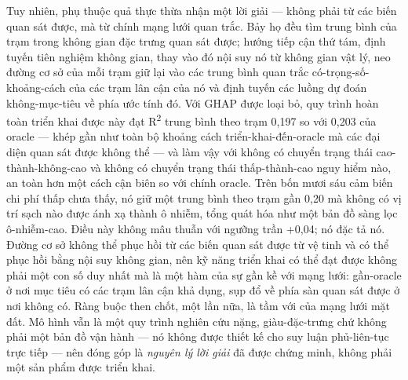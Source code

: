 Tuy nhiên, phụ thuộc quả thực thừa nhận một lời giải --- không phải từ các biến quan sát được, mà từ chính mạng lưới quan trắc. Bảy họ đều tìm trung bình của trạm trong không gian đặc trưng quan sát được; hướng tiếp cận thứ tám, định tuyến tiên nghiệm không gian, thay vào đó nội suy nó từ không gian vật lý, neo đường cơ sở của mỗi trạm giữ lại vào các trung bình quan trắc có-trọng-số-khoảng-cách của các trạm lân cận của nó và định tuyến các luồng dự đoán không-mục-tiêu về phía ước tính đó. Với GHAP được loại bỏ, quy trình hoàn toàn triển khai được này đạt R\textsuperscript{2} trung bình theo trạm 0,197 so với 0,203 của oracle --- khép gần như toàn bộ khoảng cách triển-khai-đến-oracle mà các đại diện quan sát được không thể --- và làm vậy với không có chuyển trạng thái cao-thành-không-cao và không có chuyển trạng thái thấp-thành-cao nguy hiểm nào, an toàn hơn một cách cận biên so với chính oracle. Trên bốn mươi sáu cảm biến chi phí thấp chưa thấy, nó giữ một trung bình theo trạm gần 0,20 mà không có vị trí sạch nào được ánh xạ thành ô nhiễm, tổng quát hóa như một bản đồ sàng lọc ô-nhiễm-cao. Điều này không mâu thuẫn với ngưỡng trần +0,04; nó đặc tả nó. Đường cơ sở không thể phục hồi từ các biến quan sát được từ vệ tinh và có thể phục hồi bằng nội suy không gian, nên kỹ năng triển khai có thể đạt được không phải một con số duy nhất mà là một hàm của sự gần kề với mạng lưới: gần-oracle ở nơi mục tiêu có các trạm lân cận khả dụng, sụp đổ về phía sàn quan sát được ở nơi không có. Ràng buộc then chốt, một lần nữa, là tầm với của mạng lưới mặt đất. Mô hình vẫn là một quy trình nghiên cứu nặng, giàu-đặc-trưng chứ không phải một bản đồ vận hành --- nó không được thiết kế cho suy luận phủ-liên-tục trực tiếp --- nên đóng góp là \emph{nguyên lý lời giải} đã được chứng minh, không phải một sản phẩm được triển khai.


